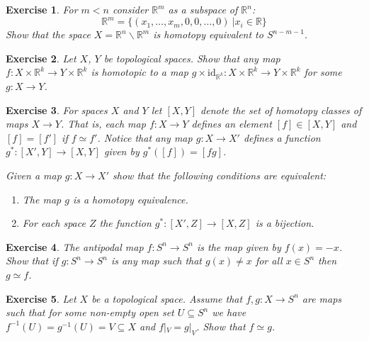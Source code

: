\documentclass[11pt, letterpaper, oneside]{report}
\theoremstyle{pplain}
\theoremstyle{ddefinition}
\theoremstyle{nnn}
\theoremstyle{eexercise}
\newtheorem{exercise}{Exercise}[chapter]
\newcommand{\R}{{\mathbb R}}
\newcommand{\id}{\mathrm{id}}
\newcommand{\ssmin}{\smallsetminus}
\renewcommand{\setminus}{\ssmin}
\newcommand{\benu}{\begin{enumerate}}
\newcommand{\eenu}{\end{enumerate}}
\begin{document}
\begin{exercise}
For $m < n$ consider $\R^{m}$ as a subspace of $\R^{n}$:
$$\R^{m} = \{(x_{1}, \dots, x_{m}, 0, 0, \dots, 0) \ | x_{i}\in \R \}$$ 
Show that the space $X = \R^{n}\setminus \R^{m}$ is homotopy equivalent to $S^{n-m-1}$.
\end{exercise}






\begin{exercise}
Let $X$, $Y$ be topological spaces. Show that any map $f\colon X\times \R^{k} \to Y\times \R^{k}$
is homotopic to a map $g \times \id_{\R^{k}} \colon X \times \R^{k} \to Y\times \R^{k}$
for some $g\colon X \to Y$. 
\end{exercise}



\begin{exercise}
For spaces $X$ and $Y$ let $[X, Y]$ denote the set of homotopy classes of maps $X \to Y$. That is, each map $f\colon X \to Y$
defines an element $[f]\in [X, Y]$ and $[f] = [f']$ if $f\simeq f'$. Notice that any map $g\colon X \to X'$ defines a function 
$g^{\ast}\colon [X', Y] \to [X, Y]$ given by $g^{\ast}([f]) = [fg]$.

Given a map $g\colon X \to X'$ show that the following conditions are equivalent:

\benu
\item[1)] The map $g$ is a homotopy equivalence. 

\item[2)] For each space $Z$ the function $g^{\ast}\colon [X', Z] \to [X, Z]$ is a bijection. 
\eenu

\end{exercise}






\begin{exercise}
The antipodal map  $f\colon S^{n} \to S^{n}$ is the map given by $f(x) = -x$. 
Show that if $g\colon S^{n}\to S^{n}$ is any map such that $g(x)\neq x$
for all $x\in S^{n}$ then $g\simeq f$. 
\end{exercise}




\begin{exercise}
Let $X$ be a topological  space. Assume that $f, g \colon X \to S^{n}$ are maps such that for some 
non-empty open set $U\subseteq S^{n}$ we have $f^{-1}(U) = g^{-1}(U) = V \subseteq X$  and 
$f|_{V} = g|_{V}$. Show that $f\simeq g$.  
\end{exercise}
\end{document}

